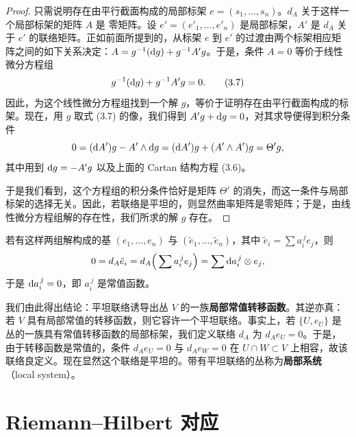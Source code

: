\begin{proof}
只需说明存在由平行截面构成的局部标架 $e=(s_1,\dots,s_n)$。$d_A$ 关于这样一个局部标架的矩阵 $A$ 是
零矩阵。设 $e'=(e'_1,\dots,e'_n)$ 是局部标架，$A'$ 是 $d_A$ 关于 $e'$ 的联络矩阵。正如前面所提到的，从标架 $e$ 到 $e'$ 的过渡由两个标架相应矩阵之间的如下关系决定：$A=g^{-1}(\mathrm{d} g)+g^{-1}A'g$。于是，条件 $A=0$ 等价于线性微分方程组
\begin{equation}
g^{-1}(\mathrm{d} g)+g^{-1}A'g=0 . \tag{3.7}
\end{equation}
因此，为这个线性微分方程组找到一个解 $g$，等价于证明存在由平行截面构成的标架。现在，用 $g$ 取式 (3.7) 的像，我们得到 $A'g+\mathrm{d} g=0$，对其求导便得到积分条件
\[
0=(\mathrm{d} A')g-A'\wedge \mathrm{d} g=(\mathrm{d} A')g+(A'\wedge A')g=\Theta'g ,
\]
其中用到 $\mathrm{d} g=-A'g$ 以及上面的 Cartan 结构方程 (3.6)。

于是我们看到，这个方程组的积分条件恰好是矩阵 $\Theta'$ 的消失，而这一条件与局部标架的选择无关。因此，若联络是平坦的，则显然曲率矩阵是零矩阵；于是，由线性微分方程组解的存在性，我们所求的解 $g$ 存在。
\end{proof}

\begin{remark}[3.23]
若有这样两组解构成的基 $(e_1,\dots,e_n)$ 与 $(\tilde e_1,\dots,\tilde e_n)$，其中 $\tilde e_i=\sum a_i^{\,j}e_j$，则
\[
0=d_A\tilde e_i=d_A\Big(\sum a_i^{\,j}e_j\Big)=\sum \mathrm{d} a_i^{\,j}\otimes e_j ,
\]
于是 $\mathrm{d} a_i^{\,j}=0$，即 $a_i^{\,j}$ 是常值函数。
\end{remark}

我们由此得出结论：平坦联络诱导出丛 $V$ 的一族\textbf{局部常值转移函数}。其逆亦真：若 $V$ 具有局部常值的转移函数，则它容许一个平坦联络。事实上，若 $\{U,e_U\}$ 是丛的一族具有常值转移函数的局部标架，我们定义联络 $d_A$ 为 $d_Ae_U=0$。于是，由于转移函数是常值的，条件 $d_Ae_U=0$ 与 $d_Ae_W=0$ 在 $U\cap W\subset V$ 上相容，故该联络良定义。现在显然这个联络是平坦的。带有平坦联络的丛称为\textbf{局部系统}（local system）。

\section{Riemann–Hilbert 对应}

